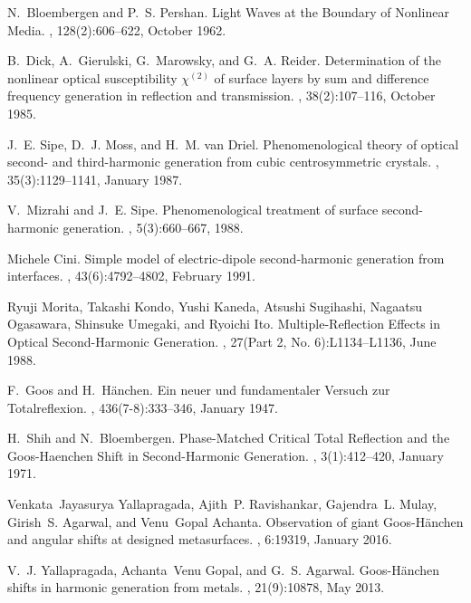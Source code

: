 \documentclass[aps,prb,10pt,showpacs,letterpaper,twocolumn]{revtex4-1}
\begin{document}
\begin{thebibliography}{10}
N.~Bloembergen and P.~S. Pershan.
\newblock Light {Waves} at the {Boundary} of {Nonlinear} {Media}.
, 128(2):606--622, October 1962.

B.~Dick, A.~Gierulski, G.~Marowsky, and G.~A. Reider.
\newblock Determination of the nonlinear optical susceptibility $\chi^{(2)}$ of
  surface layers by sum and difference frequency generation in reflection and
  transmission.
, 38(2):107--116, October 1985.

J.~E. Sipe, D.~J. Moss, and H.~M. van Driel.
\newblock Phenomenological theory of optical second- and third-harmonic
  generation from cubic centrosymmetric crystals.
, 35(3):1129--1141, January 1987.

V.~Mizrahi and J.~E. Sipe.
\newblock Phenomenological treatment of surface second-harmonic generation.
, 5(3):660--667, 1988.

Michele Cini.
\newblock Simple model of electric-dipole second-harmonic generation from
  interfaces.
, 43(6):4792--4802, February 1991.

Ryuji Morita, Takashi Kondo, Yushi Kaneda, Atsushi Sugihashi, Nagaatsu
  Ogasawara, Shinsuke Umegaki, and Ryoichi Ito.
\newblock Multiple-{Reflection} {Effects} in {Optical} {Second}-{Harmonic}
  {Generation}.
, 27(Part 2, No.
  6):L1134--L1136, June 1988.

F.~Goos and H.~H\"anchen.
\newblock Ein neuer und fundamentaler {Versuch} zur {Totalreflexion}.
, 436(7-8):333--346, January 1947.

H.~Shih and N.~Bloembergen.
\newblock Phase-{Matched} {Critical} {Total} {Reflection} and the
  {Goos}-{Haenchen} {Shift} in {Second}-{Harmonic} {Generation}.
, 3(1):412--420, January 1971.

Venkata~Jayasurya Yallapragada, Ajith~P. Ravishankar, Gajendra~L. Mulay,
  Girish~S. Agarwal, and Venu~Gopal Achanta.
\newblock Observation of giant {Goos}-{H\"anchen} and angular shifts at
  designed metasurfaces.
, 6:19319, January 2016.

V.~J. Yallapragada, Achanta~Venu Gopal, and G.~S. Agarwal.
\newblock Goos-{H\"anchen} shifts in harmonic generation from metals.
, 21(9):10878, May 2013.


\end{thebibliography}
\end{document}

